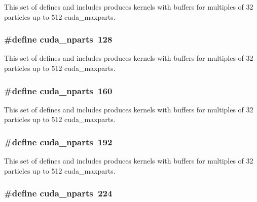 This set of defines and includes produces kernels with buffers for multiples of 32 particles up to 512 cuda\-\_\-maxparts. \hypertarget{runner__cuda_8cu_a73a9582f0db5b61423deb6c2e5ade9e8}{
\subsubsection[{cuda\-\_\-nparts}]{\setlength{\rightskip}{0pt plus 5cm}\#define cuda\-\_\-nparts~128}}\label{runner__cuda_8cu_a73a9582f0db5b61423deb6c2e5ade9e8}
This set of defines and includes produces kernels with buffers for multiples of 32 particles up to 512 cuda\-\_\-maxparts. \hypertarget{runner__cuda_8cu_a73a9582f0db5b61423deb6c2e5ade9e8}{
\subsubsection[{cuda\-\_\-nparts}]{\setlength{\rightskip}{0pt plus 5cm}\#define cuda\-\_\-nparts~160}}\label{runner__cuda_8cu_a73a9582f0db5b61423deb6c2e5ade9e8}
This set of defines and includes produces kernels with buffers for multiples of 32 particles up to 512 cuda\-\_\-maxparts. \hypertarget{runner__cuda_8cu_a73a9582f0db5b61423deb6c2e5ade9e8}{
\subsubsection[{cuda\-\_\-nparts}]{\setlength{\rightskip}{0pt plus 5cm}\#define cuda\-\_\-nparts~192}}\label{runner__cuda_8cu_a73a9582f0db5b61423deb6c2e5ade9e8}
This set of defines and includes produces kernels with buffers for multiples of 32 particles up to 512 cuda\-\_\-maxparts. \hypertarget{runner__cuda_8cu_a73a9582f0db5b61423deb6c2e5ade9e8}{
\subsubsection[{cuda\-\_\-nparts}]{\setlength{\rightskip}{0pt plus 5cm}\#define cuda\-\_\-nparts~224}}\label{runner__cuda_8cu_a73a9582f0db5b61423deb6c2e5ade9e8}
